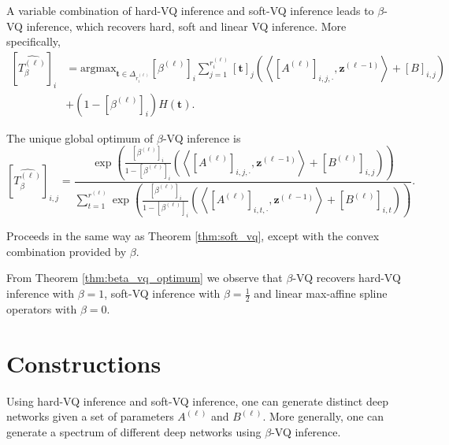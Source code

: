 A variable combination of hard-VQ inference and soft-VQ inference leads to $\beta$-VQ inference, which recovers hard, soft and linear VQ inference. More specifically,
\begin{align*}
    \left[\widehat{T_{\beta}^{(\ell)}}\right]_i&=\mathrm{argmax}_{\mathbf{t}\in\Delta_{r^{(\ell)}_i}}\left[\beta^{(\ell)}\right]_i\sum_{j=1}^{r^{(\ell)}_i}[\mathbf{t}]_j\left(\left\langle\left[A^{(\ell)}\right]_{i,j,\cdot},\mathbf{z}^{(\ell-1)}\right\rangle+[B]_{i,j}\right)\\&+\left(1-\left[\beta^{(\ell)}\right]_i\right)H(\mathbf{t}).
\end{align*}

\begin{theorem}\label{thm:beta_vq_optimum}
    The unique global optimum of $\beta$-VQ inference is $$\left[\widehat{T_{\beta}^{(\ell)}}\right]_{i,j}=\frac{\exp\left(\frac{\left[\beta^{(\ell)}\right]_i}{1-\left[\beta^{(\ell)}\right]_i}\left(\left\langle\left[A^{(\ell)}\right]_{i,j,\cdot},\mathbf{z}^{(\ell-1)}\right\rangle+\left[B^{(\ell)}\right]_{i,j}\right)\right)}{\sum_{t=1}^{r^{(\ell)}}\exp\left(\frac{\left[\beta^{(\ell)}\right]_i}{1-\left[\beta^{(\ell)}\right]_i}\left(\left\langle\left[A^{(\ell)}\right]_{i,t,\cdot},\mathbf{z}^{(\ell-1)}\right\rangle+\left[B^{(\ell)}\right]_{i,t}\right)\right)}.$$
\end{theorem}

\begin{tproof}
    Proceeds in the same way as Theorem \ref{thm:soft_vq}, except with the convex combination provided by $\beta$. 
\end{tproof}

\begin{remark}
    From Theorem \ref{thm:beta_vq_optimum} we observe that $\beta$-VQ recovers hard-VQ inference with $\beta=1$, soft-VQ inference with $\beta=\frac{1}{2}$ and linear max-affine spline operators with $\beta=0$.
\end{remark}

\section{Constructions}\label{sec:locally_non_linear_constructions}

Using hard-VQ inference and soft-VQ inference, one can generate distinct deep networks given a set of parameters $A^{(\ell)}$ and $B^{(\ell)}$. More generally, one can generate a spectrum of different deep networks using $\beta$-VQ inference.

